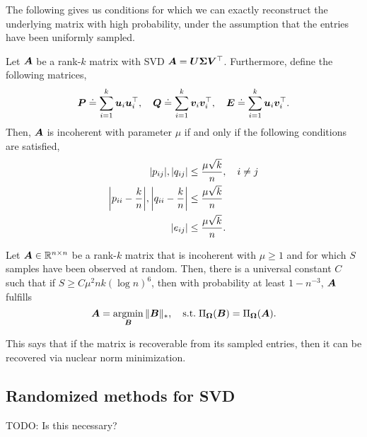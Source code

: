 The following gives us conditions for which we can exactly reconstruct the underlying matrix with
high probability, under the assumption that the entries have been uniformly sampled.

\begin{definition}[Incoherence]
    Let $\bm{A}$ be a rank-$k$ matrix with SVD $\bm{A} = \bm{U} \bm{\Sigma} \bm{V}^\top$.
    Furthermore, define the following matrices, \[
        \bm{P} \doteq \sum_{i=1}^{k} \bm{u}_i \bm{u}_i^\top, \quad \bm{Q} \doteq \sum_{i=1}^{k} \bm{v}_i \bm{v}_i^\top, \quad \bm{E} \doteq \sum_{i=1}^{k} \bm{u}_i \bm{v}_i^\top.
    \]
    Then, $\bm{A}$ is incoherent with parameter $\mu$ if and only if the following conditions are
    satisfied,
    \begin{align*}
        |p_{ij}|, |q_{ij}|                                                 & \leq \frac{\mu \sqrt{k}}{n}, \quad i \neq j \\
        \lft| p_{ii} - \frac{k}{n} \rgt|, \lft| q_{ii} - \frac{k}{n} \rgt| & \leq \frac{\mu \sqrt{k}}{n}                 \\
        |e_{ij}|                                                           & \leq \frac{\mu \sqrt{k}}{n}.
    \end{align*}
\end{definition}

\begin{theorem}
    Let $\bm{A} \in \mathbb{R}^{n \times n}$ be a rank-$k$ matrix that is incoherent with $\mu \geq 1$ and
    for which $S$ samples have been observed at random. Then, there is a universal constant $C$ such
    that if $S \geq C \mu^2 nk (\log n)^6$, then with probability at least $1 - n^{-3}$, $\bm{A}$
    fulfills \[
        \bm{A} = \operatorname*{argmin}_{\bm{B}} \| \bm{B} \|_*, \quad \mathrm{s.t.}\; \Pi_{\bm{\Omega}}(\bm{B}) = \Pi_{\bm{\Omega}}(\bm{A}).
    \]
\end{theorem}

This says that if the matrix is recoverable from its sampled entries, then it can be recovered via
nuclear norm minimization.

\subsection{Randomized methods for SVD}

TODO: Is this necessary?
